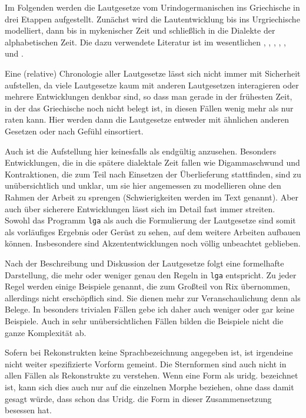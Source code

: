 \documentclass[12pt,a4paper,normalheadings,bibliography=totoc]{scrartcl}
\def\tt#1{\texttt{#1}}
\begin{document}
Im Folgenden werden die Lautgesetze vom Urindogermanischen ins Griechische
in drei Etappen aufgestellt.
Zunächst wird die Lautentwicklung bis ins Urgriechische modelliert,
dann bis in mykenischer Zeit und schließlich in die Dialekte
der alphabetischen Zeit.
Die dazu verwendete Literatur ist im wesentlichen
\cite{bart_langvok},
\cite{bart_frueh},
\cite{bart_hand},
\cite{buck},
\cite{lejeune},
\cite{rix} und
\cite{sihler}.

Eine (relative) Chronologie aller Lautgesetze lässt sich nicht immer
mit Sicherheit aufstellen,
da viele Lautgesetze kaum mit anderen Lautgesetzen interagieren
oder mehrere Entwicklungen denkbar sind,
so dass man gerade in der frühesten Zeit,
in der das Griechische noch nicht belegt ist,
in diesen Fällen wenig mehr als nur raten kann.
Hier werden dann die Lautgesetze entweder mit ähnlichen
anderen Gesetzen oder nach Gefühl einsortiert.

Auch ist die Aufstellung hier keinesfalls als endgültig anzusehen.
Besonders Entwicklungen, die in die spätere dialektale Zeit fallen
wie Digammaschwund und Kontraktionen,
die zum Teil nach Einsetzen der Überlieferung stattfinden,
sind zu unübersichtlich und unklar,
um sie hier angemessen zu modellieren ohne den Rahmen der Arbeit zu sprengen
(Schwierigkeiten werden im Text genannt).
Aber auch über sicherere Entwicklungen lässt sich im Detail fast immer streiten.
Sowohl das Programm \tt{lga} als auch die Formulierung
der Lautgesetze sind somit als vorläufiges Ergebnis oder Gerüst zu sehen,
auf dem weitere Arbeiten aufbauen können.
Insbesondere sind Akzententwicklungen noch völlig unbeachtet geblieben.

Nach der Beschreibung und Diskussion der Lautgesetze folgt eine
formelhafte Darstellung,
 die mehr oder weniger genau den Regeln in \tt{lga} entspricht.
Zu jeder Regel werden einige Beispiele genannt,
die zum Großteil von Rix übernommen,
allerdings nicht erschöpflich sind.
Sie dienen mehr zur Veranschaulichung denn als Belege.
In besonders trivialen Fällen gebe ich daher auch weniger oder
gar keine Beispiele.
Auch in sehr unübersichtlichen Fällen bilden die Beispiele nicht
die ganze Komplexität ab.

Sofern bei Rekonstrukten keine Sprachbezeichnung angegeben ist,
ist irgendeine nicht weiter spezifizierte Vorform gemeint.
Die Sternformen sind auch nicht in allen Fällen als
Rekonstrukte zu verstehen.
Wenn eine Form als uridg. bezeichnet ist,
kann sich dies auch nur auf die einzelnen Morphe beziehen,
ohne dass damit gesagt würde,
dass schon das Uridg. die Form in dieser Zusammensetzung besessen hat.
\end{document}
